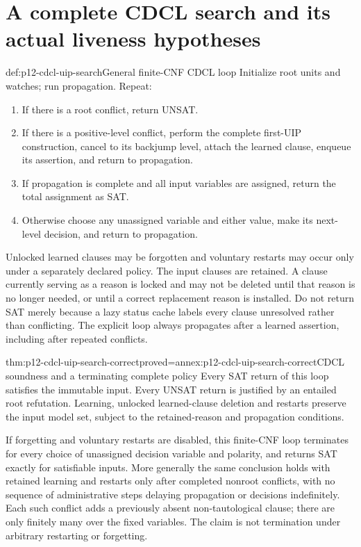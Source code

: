 \section{A complete CDCL search and its actual liveness hypotheses}

\begin{hbmethod}{def:p12-cdcl-uip-search}{General finite-CNF CDCL loop}
Initialize root units and watches; run propagation.  Repeat:
\begin{enumerate}
 \item If there is a root conflict, return UNSAT.
 \item If there is a positive-level conflict, perform the complete first-UIP
       construction, cancel to its backjump level, attach the learned clause,
       enqueue its assertion, and return to propagation.
 \item If propagation is complete and all input variables are assigned,
       return the total assignment as SAT.
 \item Otherwise choose any unassigned variable and either value, make its
       next-level decision, and return to propagation.
\end{enumerate}
Unlocked learned clauses may be forgotten and voluntary restarts may occur
only under a separately declared policy.  The input clauses are retained.
A clause currently serving as a reason is locked and may not be deleted until
that reason is no longer needed, or until a correct replacement reason is
installed.  Do not return SAT merely because a lazy status cache labels every
clause unresolved rather than conflicting.  The explicit loop always
propagates after a learned assertion, including after repeated conflicts.
\end{hbmethod}

\begin{hbtheorem}{thm:p12-cdcl-uip-search-correct}{proved=annex:p12-cdcl-uip-search-correct}{CDCL soundness and a terminating complete policy}
Every SAT return of this loop satisfies the immutable input.  Every UNSAT
return is justified by an entailed root refutation.  Learning, unlocked
learned-clause deletion and restarts preserve the input model set, subject to
the retained-reason and propagation conditions.

If forgetting and voluntary restarts are disabled, this finite-CNF loop
terminates for every choice of unassigned decision variable and polarity, and
returns SAT exactly for satisfiable inputs.  More generally the same conclusion
holds with retained learning and restarts only after completed nonroot
conflicts, with no sequence of administrative steps delaying propagation or
decisions indefinitely.  Each such conflict adds a previously absent
non-tautological clause; there are only finitely many over the fixed variables.
The claim is not termination under arbitrary restarting or forgetting.
\end{hbtheorem}

